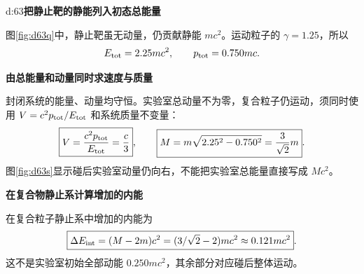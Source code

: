 \begin{drillsolution}{d:63}\textbf{把静止靶的静能列入初态总能量}\par\nobreak
图\ref{fig:d63q}中，静止靶虽无动量，仍贡献静能 $mc^2$。运动粒子的 \(\gamma=1.25\)，所以
\[
 E_{\rm tot}=2.25mc^2,\qquad p_{\rm tot}=0.750mc.
\]


\par\medskip{}\noindent\textbf{由总能量和动量同时求速度与质量}\par\nobreak
封闭系统的能量、动量均守恒。实验室总动量不为零，复合粒子仍运动，须同时使用 $V=c^2p_{\rm tot}/E_{\rm tot}$ 和系统质量不变量：
\[
 \boxed{V=\frac{c^2p_{\rm tot}}{E_{\rm tot}}=\frac c3},\qquad
 \boxed{M=m\sqrt{2.25^2-0.750^2}=\frac3{\sqrt2}m}.
\]
图\ref{fig:d63s}显示碰后实验室动量仍向右，不能把实验室总能量直接写成 \(Mc^2\)。


\par\medskip{}\noindent\textbf{在复合物静止系计算增加的内能}\par\nobreak
在复合粒子静止系中增加的内能为
\[
 \boxed{\Delta E_{\rm int}=(M-2m)c^2=(3/\sqrt2-2)mc^2\approx0.121mc^2}.
\]
这不是实验室初始全部动能 \(0.250mc^2\)，其余部分对应碰后整体运动。
\end{drillsolution}

